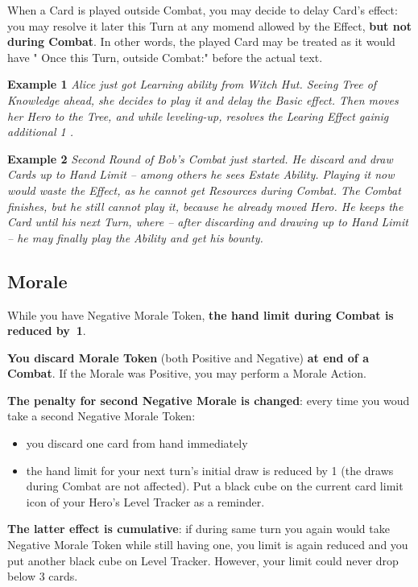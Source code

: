 \begin{multicols*}{2}
    When a Card is played outside Combat, you may decide to delay Card's effect: you may resolve it later this Turn at any momend allowed by the Effect, \textbf{but not during Combat}. In other words, the played Card may be treated as it would have " Once this Turn, outside Combat:" before the actual text.
    
    
    \textbf{Example 1} \textit{Alice just got Learning ability from Witch Hut. Seeing Tree of Knowledge ahead, she decides to play it and delay the Basic effect. Then moves her Hero to the Tree, and while leveling-up, resolves the Learing Effect gainig additional 1 .}
    
    \textbf{Example 2} \textit{Second Round of Bob's Combat just started. He discard and draw Cards up to Hand Limit -- among others he sees Estate Ability. Playing it now would waste the Effect, as he cannot get Resources during Combat. The Combat finishes, but he still cannot play it, because he already moved Hero. He keeps the Card until his next Turn, where -- after discarding and drawing up to Hand Limit -- he may finally play the Ability and get his bounty.}
            
    \subsection*{Morale}
    
    While you have Negative Morale Token, \textbf{the hand limit during Combat is reduced by~1}.
    
    \textbf{You discard Morale Token} (both Positive and Negative) \textbf{at end of a Combat}. If the Morale was Positive, you may perform a Morale Action.
    
    \textbf{The penalty for second Negative Morale is changed}: every time you woud take a second Negative Morale Token:
    \begin{itemize}
        \item you discard one card from hand immediately
        \item the hand limit for your next turn's initial draw is reduced by 1 (the draws during Combat are not affected). Put a black cube on the current card limit icon of your Hero's Level Tracker as a reminder. 
    \end{itemize} 
    \textbf{The latter effect is cumulative}: if during same turn you again would take Negative Morale Token while still having one, you limit is again reduced and you put another black cube on Level Tracker. However, your limit could never drop below 3 cards.
    

\end{multicols*}
